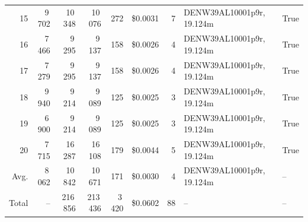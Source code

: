\documentclass[a4paper,11pt]{article}
\begin{document}
\begin{table}[ht]
\begin{tabular}{r r r r r r r p{3cm} l}
15 & 9\,702 & 10\,348 & 10\,076 & 272 & \$0.0031 & 7 & DENW39AL10001p9r, 19.124m & True \\
16 & 7\,466 & 9\,295 & 9\,137 & 158 & \$0.0026 & 4 & DENW39AL10001p9r, 19.124m & True \\
17 & 7\,279 & 9\,295 & 9\,137 & 158 & \$0.0026 & 4 & DENW39AL10001p9r, 19.124m & True \\
18 & 9\,940 & 9\,214 & 9\,089 & 125 & \$0.0025 & 3 & DENW39AL10001p9r, 19.124m & True \\
19 & 6\,900 & 9\,214 & 9\,089 & 125 & \$0.0025 & 3 & DENW39AL10001p9r, 19.124m & True \\
20 & 7\,715 & 16\,287 & 16\,108 & 179 & \$0.0044 & 5 & DENW39AL10001p9r, 19.124m & True \\
\hline
Avg. & 8\,062 & 10\,842 & 10\,671 & 171 & \$0.0030 & 4 & DENW39AL10001p9r, 19.124m & -- \\
Total & -- & 216\,856 & 213\,436 & 3\,420 & \$0.0602 & 88 & -- & -- \\
\hline
\end{tabular}
\end{table}

\clearpage
\end{document}
